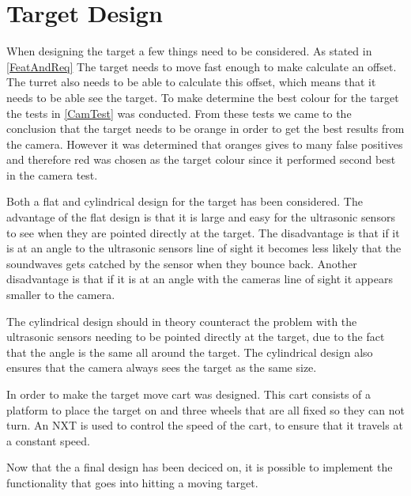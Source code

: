 \section{Target Design}
When designing the target a few things need to be considered. As stated in
\autoref{FeatAndReq} The target needs to move fast enough to make \name
calculate an offset. The turret also needs to be able to calculate this offset,
which means that it needs to be able see the target. To make determine the
best colour for the target the tests in \autoref{CamTest} was conducted. From
these tests we came to the conclusion that the target needs to be orange in
order to get the best results from the camera.
However it was determined that oranges gives to many false positives and
therefore red was chosen as the target colour since it performed second best in
the camera test.\nl

Both a flat and cylindrical design for the target has been considered. The
advantage of the flat design is that it is large and easy for the ultrasonic
sensors to see when they are pointed directly at the target. The disadvantage
is that if it is at an angle to the ultrasonic sensors line of sight it 
becomes less likely that the soundwaves gets catched by the sensor when they
bounce back. Another disadvantage is that if it is at an angle with the
cameras line of sight it appears smaller to the camera.\nl

The cylindrical design should in theory counteract the problem with the
ultrasonic sensors needing to be pointed directly at the target, due to the
fact that the angle is the same all around the target. The cylindrical design
also ensures that the camera always sees the target as the same size.\nl

In order to make the target move cart was designed. This cart consists of a
platform to place the target on and three wheels that are all fixed so they can
not turn. An NXT is used to control the speed of the cart, to ensure that it
travels at a constant speed.\nl

Now that the a final design has been deciced on, it is possible to implement the
functionality that goes into hitting a moving target.




